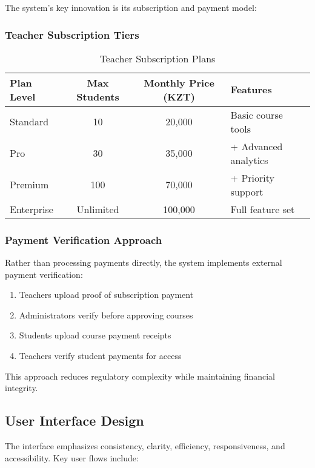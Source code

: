 The system's key innovation is its subscription and payment model:

\subsubsection{Teacher Subscription Tiers}

\begin{table}[h]
\centering
\begin{tabular}{|l|c|c|l|}
\hline
\textbf{Plan Level} & \textbf{Max Students} & \textbf{Monthly Price (KZT)} & \textbf{Features} \\
\hline
Standard & 10 & 20,000 & Basic course tools \\
Pro & 30 & 35,000 & + Advanced analytics \\
Premium & 100 & 70,000 & + Priority support \\
Enterprise & Unlimited & 100,000 & Full feature set \\
\hline
\end{tabular}
\caption{Teacher Subscription Plans}
\label{tab:subscription-plans}
\end{table}

\subsubsection{Payment Verification Approach}

Rather than processing payments directly, the system implements external payment verification:

\begin{enumerate}
    \item Teachers upload proof of subscription payment
    \item Administrators verify before approving courses
    \item Students upload course payment receipts
    \item Teachers verify student payments for access
\end{enumerate}

This approach reduces regulatory complexity while maintaining financial integrity.

\subsection{User Interface Design}

The interface emphasizes consistency, clarity, efficiency, responsiveness, and accessibility. Key user flows include:

